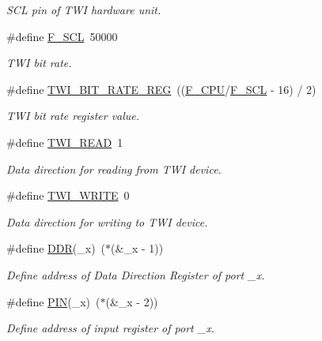 \begin{DoxyCompactItemize}
\begin{DoxyCompactList}\small\item\em S\+CL pin of T\+WI hardware unit. \end{DoxyCompactList}\item 
\#define \hyperlink{a00007_ga7a1c522bed64982971384489ee477bd3}{F\+\_\+\+S\+CL}~50000
\begin{DoxyCompactList}\small\item\em T\+WI bit rate. \end{DoxyCompactList}\item 
\#define \hyperlink{a00007_ga801c158406ca2334b446e442a2debe37}{T\+W\+I\+\_\+\+B\+I\+T\+\_\+\+R\+A\+T\+E\+\_\+\+R\+EG}~((\hyperlink{a00007_ga43bafb28b29491ec7f871319b5a3b2f8}{F\+\_\+\+C\+PU}/\hyperlink{a00007_ga7a1c522bed64982971384489ee477bd3}{F\+\_\+\+S\+CL} -\/ 16) / 2)\hypertarget{a00007_ga801c158406ca2334b446e442a2debe37}{}\label{a00007_ga801c158406ca2334b446e442a2debe37}

\begin{DoxyCompactList}\small\item\em T\+WI bit rate register value. \end{DoxyCompactList}\item 
\#define \hyperlink{a00007_gaaf9a8abccd811954f9cc316f2b2f87b3}{T\+W\+I\+\_\+\+R\+E\+AD}~1\hypertarget{a00007_gaaf9a8abccd811954f9cc316f2b2f87b3}{}\label{a00007_gaaf9a8abccd811954f9cc316f2b2f87b3}

\begin{DoxyCompactList}\small\item\em Data direction for reading from T\+WI device. \end{DoxyCompactList}\item 
\#define \hyperlink{a00007_ga3b68e8e777b71520f9dbfac733774d5f}{T\+W\+I\+\_\+\+W\+R\+I\+TE}~0\hypertarget{a00007_ga3b68e8e777b71520f9dbfac733774d5f}{}\label{a00007_ga3b68e8e777b71520f9dbfac733774d5f}

\begin{DoxyCompactList}\small\item\em Data direction for writing to T\+WI device. \end{DoxyCompactList}\item 
\#define \hyperlink{a00007_ga6c0346728feb274834cad94daca316ee}{D\+DR}(\+\_\+x)~($\ast$(\&\+\_\+x -\/ 1))\hypertarget{a00007_ga6c0346728feb274834cad94daca316ee}{}\label{a00007_ga6c0346728feb274834cad94daca316ee}

\begin{DoxyCompactList}\small\item\em Define address of Data Direction Register of port \+\_\+x. \end{DoxyCompactList}\item 
\#define \hyperlink{a00007_ga740f9eb9c9f9e33500ee61ec53945f6a}{P\+IN}(\+\_\+x)~($\ast$(\&\+\_\+x -\/ 2))\hypertarget{a00007_ga740f9eb9c9f9e33500ee61ec53945f6a}{}\label{a00007_ga740f9eb9c9f9e33500ee61ec53945f6a}

\begin{DoxyCompactList}\small\item\em Define address of input register of port \+\_\+x. \end{DoxyCompactList}\end{DoxyCompactItemize}
